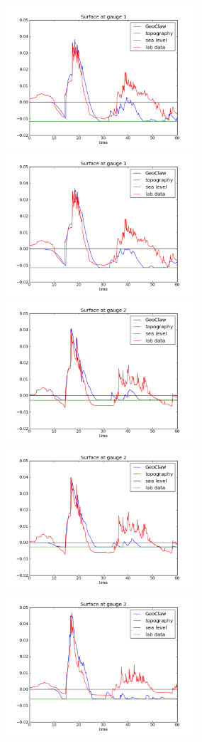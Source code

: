 \documentclass[11pt]{article}
\begin{document}
\begin{figure}[ht]
\hfil\includegraphics[width=2.8in]{bp7/figs423/gauge0001fig300.png}\hfil
\hfil\includegraphics[width=2.8in]{bp7/figs160/gauge0001fig300.png}\hfil
\vskip 5pt
\hfil\includegraphics[width=2.8in]{bp7/figs423/gauge0002fig300.png}\hfil
\hfil\includegraphics[width=2.8in]{bp7/figs160/gauge0002fig300.png}\hfil
\vskip 5pt
\hfil\includegraphics[width=2.8in]{bp7/figs423/gauge0003fig300.png}\hfil

\end{figure}
\end{document}
